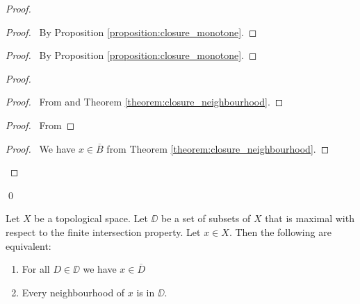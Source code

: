 \begin{proof}
    \pf
    \begin{proof}
        \pf\ By Proposition \ref{proposition:closure_monotone}.
    \end{proof}
    \begin{proof}
        \pf\ By Proposition \ref{proposition:closure_monotone}.
    \end{proof}
    \begin{proof}
        \begin{proof}
            \pf\ From  and Theorem \ref{theorem:closure_neighbourhood}.
        \end{proof}
        \begin{proof}
            \pf\ From 
        \end{proof}
        \qedstep
        \begin{proof}
            \pf\ We have $x \in \overline{B}$ from Theorem \ref{theorem:closure_neighbourhood}.
        \end{proof}
    \end{proof}
    \qed
\end{proof}

\begin{proposition}
    \label{proposition:every_closure_maximal_fip}
    Let $X$ be a topological space. Let $\DD$ be a set of subsets of $X$ that is maximal with respect to the finite intersection property. Let $x \in X$.
    Then the following are equivalent:
    \begin{enumerate}
        \item For all $D \in \DD$ we have $x \in \overline{D}$
        \item Every neighbourhood of $x$ is in $\DD$.
    \end{enumerate}
\end{proposition}

